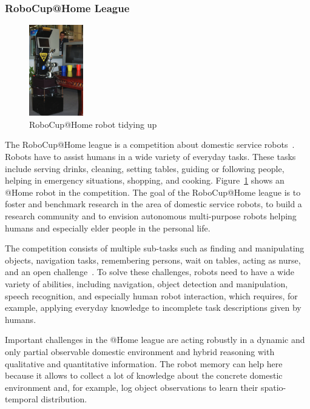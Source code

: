 \documentclass[a4paper,11pt]{article}
\newcommand{\reffig}[1]{Figure~\ref{#1}}
\begin{document}
\subsubsection{RoboCup@Home League}
\begin{figure}
  \centering
  \includegraphics[height=150px]{img/ceasar}%
  \caption{RoboCup@Home robot tidying up~\cite{wisspeintner2009robocup}}
  \vspace{-2mm}
  \label{fig:athome}
\end{figure}

The RoboCup@Home league is a competition about domestic service
robots~\cite{wisspeintner2009robocup}. Robots have to assist
humans in a wide variety of everyday tasks. These tasks include
serving drinks, cleaning, setting tables, guiding or following people,
helping in emergency situations, shopping, and cooking.
\reffig{fig:athome} shows an @Home robot in the
competition.
%
The goal of the RoboCup@Home league is to foster and benchmark
research in the area of domestic service robots, to build a research
community and to envision autonomous multi-purpose robots helping
humans and especially elder people in the personal life.

The competition consists of multiple sub-tasks
such as finding and manipulating objects, navigation tasks,
remembering persons, wait on tables, acting as
nurse, and an open challenge~\cite{athome-rules}.
To solve these challenges, robots need to
have a wide variety of abilities, including navigation, object
detection and manipulation, speech recognition, and especially human
robot interaction, which requires, for example, applying everyday
knowledge to incomplete task descriptions given by humans.

Important challenges in the @Home league are acting robustly in a
dynamic and only partial observable domestic environment and hybrid
reasoning with qualitative and quantitative information.
The robot memory can help here because it allows to collect a lot
of knowledge about the concrete domestic environment and, for example,
log object observations to learn their spatio-temporal distribution.
\end{document}
